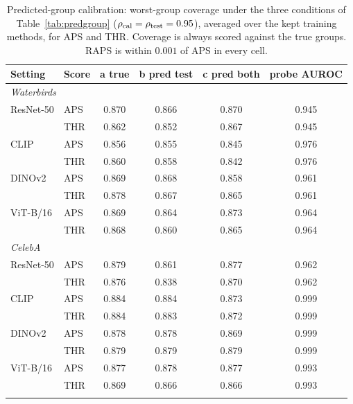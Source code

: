 \begin{table}[!ht]
\centering
\caption{Predicted-group calibration: worst-group coverage under the three conditions of Table~\ref{tab:predgroup} ($\rho_{\mathrm{cal}}=\rho_{\mathrm{test}}=0.95$), averaged over the kept training methods, for APS and THR. Coverage is always scored against the true groups. RAPS is within $0.001$ of APS in every cell.}
\label{tab:pgfull}
\footnotesize
\setlength{\tabcolsep}{3.5pt}
\begin{tabular}{llcccc}
\toprule
Setting & Score & a true & b pred test & c pred both & probe AUROC \\
\midrule
\multicolumn{6}{l}{\emph{Waterbirds}} \\
ResNet-50 & APS & 0.870 & 0.866 & 0.870 & 0.945 \\
 & THR & 0.862 & 0.852 & 0.867 & 0.945 \\
CLIP & APS & 0.856 & 0.855 & 0.845 & 0.976 \\
 & THR & 0.860 & 0.858 & 0.842 & 0.976 \\
DINOv2 & APS & 0.869 & 0.868 & 0.858 & 0.961 \\
 & THR & 0.878 & 0.867 & 0.865 & 0.961 \\
ViT-B/16 & APS & 0.869 & 0.864 & 0.873 & 0.964 \\
 & THR & 0.868 & 0.860 & 0.865 & 0.964 \\
\multicolumn{6}{l}{\emph{CelebA}} \\
ResNet-50 & APS & 0.879 & 0.861 & 0.877 & 0.962 \\
 & THR & 0.876 & 0.838 & 0.870 & 0.962 \\
CLIP & APS & 0.884 & 0.884 & 0.873 & 0.999 \\
 & THR & 0.884 & 0.883 & 0.872 & 0.999 \\
DINOv2 & APS & 0.878 & 0.878 & 0.869 & 0.999 \\
 & THR & 0.879 & 0.879 & 0.879 & 0.999 \\
ViT-B/16 & APS & 0.877 & 0.878 & 0.877 & 0.993 \\
 & THR & 0.869 & 0.866 & 0.866 & 0.993 \\
\botrule
\end{tabular}
\end{table}

